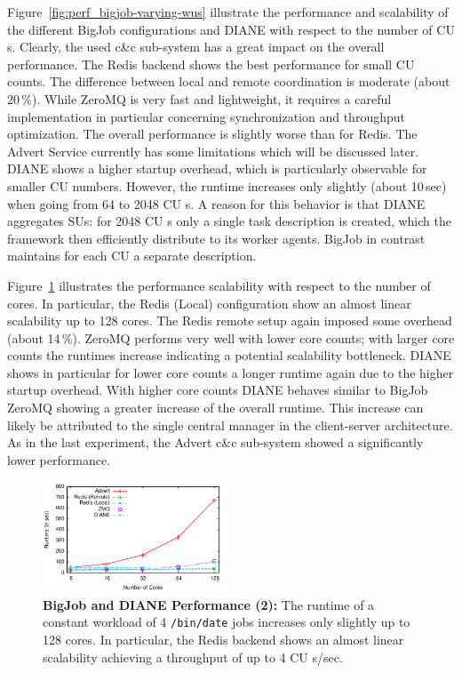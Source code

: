 \documentclass[conference,final]{IEEEtran}
\newcommand{\cu}{CU\xspace}
\newcommand{\upp}{\vspace*{-0.5em}}
\begin{document}
Figure~\ref{fig:perf_bigjob-varying-wus} illustrate the performance and
scalability of the different BigJob configurations and DIANE with respect to the
number of \cu s. Clearly, the used c\&c sub-system has a great impact on the
overall performance. The Redis backend shows the best performance for small \cu 
counts. The difference between local and remote coordination is moderate (about
20\,\%). While ZeroMQ is very fast and lightweight, it requires a careful
implementation in particular concerning synchronization and throughput
optimization. The overall performance is slightly worse than for Redis. The
Advert Service currently has some limitations which will be discussed later.
DIANE shows a higher startup overhead, which is particularly observable for
smaller \cu  numbers. However, the runtime increases only slightly (about 10\,sec)
when going from 64 to 2048 \cu s. A reason for this behavior is that DIANE
aggregates SUs: for 2048 \cu s only a single task description is created, which
the framework then efficiently distribute to its worker agents. BigJob in
contrast maintains for each \cu  a separate description. 

Figure~\ref{fig:perf_bigjob-varying-cores} illustrates the performance
scalability with respect to the number of cores. In particular, the Redis
(Local) configuration show an almost linear scalability up to 128 cores. The
Redis remote setup again imposed some overhead (about 14\,\%). ZeroMQ performs
very well with lower core counts; with larger core counts the runtimes increase
indicating a potential scalability bottleneck. DIANE shows in particular for
lower core counts a longer runtime again due to the higher startup overhead.
With higher core counts DIANE behaves similar to BigJob ZeroMQ showing a greater
increase of the overall runtime. This increase can likely be attributed to
the single central manager in the client-server architecture. As in the last
experiment, the Advert c\&c sub-system showed a significantly lower performance.

\begin{figure}[htbp] \centering
\includegraphics[width=0.49\textwidth]{perf/bigjob-varying-cores-alamo.pdf}
\caption{\textbf{BigJob and DIANE Performance (2):}  The
runtime of a constant workload of 4 \texttt{/bin/date} jobs 
increases only slightly up to 128 cores. In particular, the Redis backend shows
an almost linear scalability achieving a throughput of up to 4 \cu s/sec. }
\label{fig:perf_bigjob-varying-cores} 
\upp\upp
\end{figure}
\end{document}
